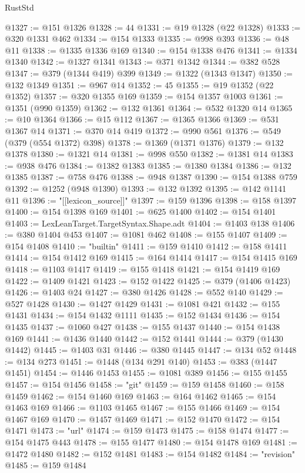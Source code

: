 \begin{lexlean}{RustStd}
\begin{coremodule}
{\begin{coremodule}
{{{{{{{{{{{{{{{{{{{{{{{{{{{{{{{{{{{{{{{{{{{{{{{{{{{{{{{{{{{{{{{{{{{{{{{{{{{{{{{{@1327 := @151 @1326
@1328 := 44
@1331 := @19 @1328 (@22 @1328)
@1333 := @320 @1331 @462
@1334 := @154 @1333
@1335 := @998 @393
@1336 := @48 @11
@1338 := @1335 @1336 @169
@1340 := @154 @1338 @476
@1341 := @1334 @1340
@1342 := @1327 @1341
@1343 := @371 @1342
@1344 := @382 @528
@1347 := @379 (@1344 @419) @399
@1349 := @1322 (@1343 @1347)
@1350 := @132 @1349
@1351 := @967 @14
@1352 := 45
@1355 := @19 @1352 (@22 @1352)
@1357 := @320 @1355 @169
@1359 := @154 @1357 @1003
@1361 := @1351 (@990 @1359)
@1362 := @132 @1361
@1364 := @532 @1320 @14
@1365 := @10 @1364
@1366 := @15 @112
@1367 := @1365 @1366
@1369 := @531 @1367 @14
@1371 := @370 @14 @419
@1372 := @990 @561
@1376 := @549 (@379 (@554 @1372) @398)
@1378 := @1369 (@1371 @1376)
@1379 := @132 @1378
@1380 := @1321 @14
@1381 := @998 @550
@1382 := @1381 @14
@1383 := @938 @476
@1384 := @1382 @1383
@1385 := @1380 @1384
@1386 := @132 @1385
@1387 := @758 @476
@1388 := @948 @1387
@1390 := @154 @1388 @759
@1392 := @1252 (@948 @1390)
@1393 := @132 @1392
@1395 := @142 @1141 @11
@1396 := "[[lexicon_source]]"
@1397 := @159 @1396
@1398 := @158 @1397
@1400 := @154 @1398 @169
@1401 := @625 @1400
@1402 := @154 @1401
@1403 := LexLeanTarget.TargetSyntax.Shape.adt
@1404 := @1403 @138
@1406 := @380 @1404 @453
@1407 := @1081 @462
@1408 := @155 @1407
@1409 := @154 @1408
@1410 := "builtin"
@1411 := @159 @1410
@1412 := @158 @1411
@1414 := @154 @1412 @169
@1415 := @164 @1414
@1417 := @154 @1415 @169
@1418 := @1103 @1417
@1419 := @155 @1418
@1421 := @154 @1419 @169
@1422 := @1409 @1421
@1423 := @152 @1422
@1425 := @379 (@1406 @1423)
@1426 := @1403 @24
@1427 := @380 @1426
@1428 := @552 @140
@1429 := @527 @1428
@1430 := @1427 @1429
@1431 := @1081 @421
@1432 := @155 @1431
@1434 := @154 @1432 @1111
@1435 := @152 @1434
@1436 := @154 @1435
@1437 := @1060 @427
@1438 := @155 @1437
@1440 := @154 @1438 @169
@1441 := @1436 @1440
@1442 := @152 @1441
@1444 := @379 (@1430 @1442)
@1445 := @1403 @31
@1446 := @380 @1445
@1447 := @134 @52
@1448 := @134 @273
@1451 := @1448 (@134 @291 @140)
@1453 := @383 (@1447 @1451)
@1454 := @1446 @1453
@1455 := @1081 @389
@1456 := @155 @1455
@1457 := @154 @1456
@1458 := "git"
@1459 := @159 @1458
@1460 := @158 @1459
@1462 := @154 @1460 @169
@1463 := @164 @1462
@1465 := @154 @1463 @169
@1466 := @1103 @1465
@1467 := @155 @1466
@1469 := @154 @1467 @169
@1470 := @1457 @1469
@1471 := @152 @1470
@1472 := @154 @1471
@1473 := "url"
@1474 := @159 @1473
@1475 := @158 @1474
@1477 := @154 @1475 @443
@1478 := @155 @1477
@1480 := @154 @1478 @169
@1481 := @1472 @1480
@1482 := @152 @1481
@1483 := @154 @1482
@1484 := "revision"
@1485 := @159 @1484
}}}}}}}}}}}}}}}}}}}}}}}}}}}}}}}}}}}}}}}}}}}}}}}}}}}}}}}}}}}}}}}}}}}}}}}}}}}}}}}}
\end{coremodule}}
\end{coremodule}
\end{lexlean}
